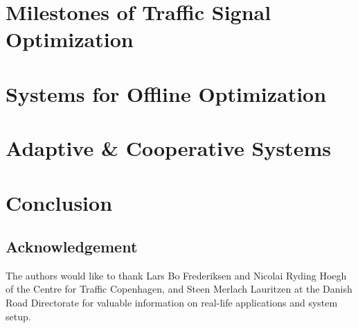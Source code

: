 \documentclass [a4paper, 10pt]{article}
\begin{document}
%

\section{Milestones of Traffic Signal Optimization}


\section{Systems for Offline Optimization}


\section{Adaptive \& Cooperative Systems}


%

\section{Conclusion}


\subsection*{Acknowledgement} The authors would like to thank Lars Bo Frederiksen and Nicolai Ryding Hoegh of the Centre for Traffic Copenhagen, and Steen Merlach
Lauritzen at the Danish Road Directorate for valuable information on
real-life applications and system setup.



\end{document}
